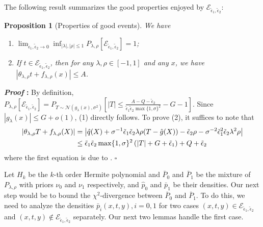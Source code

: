 \documentclass{article}
\def\eps{{\epsilon}}
\def\gE{{\mathcal{E}}}
\def\gN{{\mathcal{N}}}
\newtheorem{proposition}{Proposition}[section]
\renewenvironment{proof}{\noindent\textbf{\textit{Proof }:}}{\hfill$\square$}
\begin{document}
The following result summarizes the good properties enjoyed by $\gE_{\tilde{\eps}_1,\tilde{\eps}_2}$:
\begin{proposition}[Properties of good events]
    \label{prop:good-event-properties}
    We have
    \begin{enumerate}[(1).]
        \item $\lim_{\tilde{\eps}_1,\tilde{\eps}_2\to 0}\inf_{|\lambda|,|\rho|\leq 1}P_{\lambda,\rho}[\gE_{\tilde{\eps}_1,\tilde{\eps}_2}] = 1$;
        \item If $t\in\gE_{\tilde{\eps}_1,\tilde{\eps}_2}$, then for any $\lambda,\rho\in[-1,1]$ and any $x$, we have $\left|\theta_{\lambda,\rho}t+f_{\lambda,\rho}(x)\right| \leq A$.
    \end{enumerate}
\end{proposition}
\begin{proof}
    By definition, $P_{\lambda,\rho}[\gE_{\tilde{\eps}_1,\tilde{\eps}_2}] = P_{T\sim\gN(g_{\lambda}(x),\sigma^2)}\left[|T|\leq \frac{A-Q-\tilde{\eps}_2}{\tilde{\eps}_1\tilde{\eps}_2\max\{1,\sigma\}^2} - G -1 \right]$. Since $|g_{\lambda}(x)|\leq G+o(1)$, (1) directly follows. To prove (2), it suffices to note that
    \begin{equation}
        \notag
        \begin{aligned}
            \left|\theta_{\lambda,\rho}T+f_{\lambda,\rho}(X)\right| &= \left|\hat{q}(X)+\sigma^{-1}\tilde{\eps}_1\tilde{\eps}_2\lambda\rho(T-\hat{g}(X))-\tilde{\eps}_2\rho-\sigma^{-2}\tilde{\eps}_1^2\tilde{\eps}_2\lambda^2\rho\right| \\
            &\leq \tilde{\eps}_1\tilde{\eps}_2\max\{1,\sigma\}^2\left(|T|+G+\tilde{\eps}_1\right) + Q + \tilde{\eps}_2
        \end{aligned}
    \end{equation}
    where the first equation is due to .
\end{proof}

Let $H_k$ be the $k$-th order Hermite polynomial and $\bar{P}_0$ and $\bar{P}_1$ be the mixture of $P_{\lambda,\rho}$ with priors $\nu_0$ and $\nu_1$ respectively, and $\hat{p}_0$ and $\bar{p}_1$ be their densities. Our next step would be to bound the $\chi^2$-divergence between $\bar{P}_0$ and $\bar{P}_1$. To do this, we need to analyze the densities $\bar{p}_i(x,t,y),i=0,1$ for two cases $(x,t,y)\in\gE_{\tilde{\eps}_1,\tilde{\eps}_2}$ and $(x,t,y)\notin\gE_{\tilde{\eps}_1,\tilde{\eps}_2}$ separately. Our next two lemmas handle the first case.  
\end{document}

